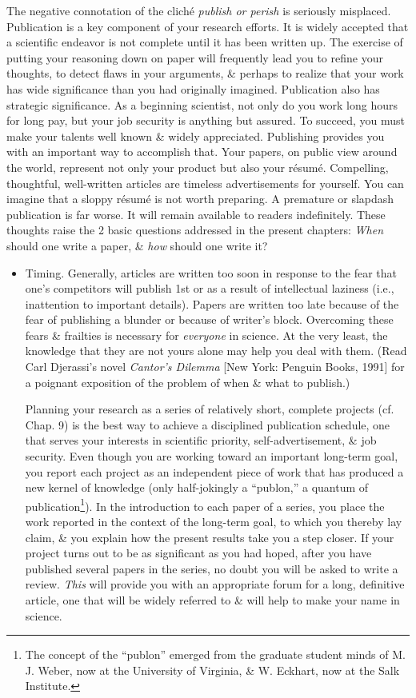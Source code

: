 \documentclass{article}
\begin{document}
\begin{enumerate}
\begin{itemize}
		The negative connotation of the clich\'e  \textit{publish or perish} is seriously misplaced. Publication is a key component of your research efforts. It is widely accepted that a scientific endeavor is not complete until it has been written up. The exercise of putting your reasoning down on paper will frequently lead you to refine your thoughts, to detect flaws in your arguments, \& perhaps to realize that your work has wide significance than you had originally imagined. Publication also has strategic significance. As a beginning scientist, not only do you work long hours for long pay, but your job security is anything but assured. To succeed, you must make your talents well known \& widely appreciated. Publishing provides you with an important way to accomplish that. Your papers, on public view around the world, represent not only your product but also your r\'esum\'e. Compelling, thoughtful, well-written articles are timeless advertisements for yourself. You can imagine that a sloppy r\'esum\'e is not worth preparing. A premature or slapdash publication is far worse. It will remain available to readers indefinitely. These thoughts raise the 2 basic questions addressed in the present chapters: \textit{When} should one write a paper, \& \textit{how} should one write it?
		\begin{itemize}
			\item {\sf Timing.} Generally, articles are written too soon in response to the fear that one's competitors will publish 1st or as a result of intellectual laziness (i.e., inattention to important details). Papers are written too late because of the fear of publishing a blunder or because of writer's block. Overcoming these fears \& frailties is necessary for \textit{everyone} in science. At the very least, the knowledge that they are not yours alone may help you deal with them. (Read Carl Djerassi's novel \textit{Cantor's Dilemma} [New York: Penguin Books, 1991] for a poignant exposition of the problem of when \& what to publish.)

			Planning your research as a series of relatively short, complete projects (cf. Chap. 9) is the best way to achieve a disciplined publication schedule, one that serves your interests in scientific priority, self-advertisement, \& job security. Even though you are working toward an important long-term goal, you report each project as an independent piece of work that has produced a new kernel of knowledge (only half-jokingly a ``publon,'' a quantum of publication\footnote{The concept of the ``publon'' emerged from the graduate student minds of M. J. Weber, now at the University of Virginia, \& W. Eckhart, now at the Salk Institute.}). In the introduction to each paper of a series, you place the work reported in the context of the long-term goal, to which you thereby lay claim, \& you explain how the present results take you a step closer. If your project turns out to be as significant as you had hoped, after you have published several papers in the series, no doubt you will be asked to write a review. \textit{This} will provide you with an appropriate forum for a long, definitive article, one that will be widely referred to \& will help to make your name in science.


\end{itemize}
\end{itemize}
\end{enumerate}
\end{document}

